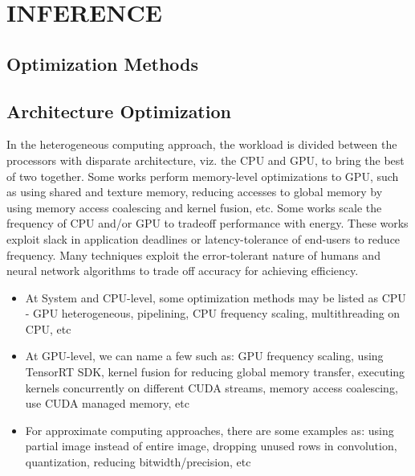 \chapter{INFERENCE}

\renewcommand{\headrulewidth}{0.5pt}
\renewcommand{\footrulewidth}{0.5pt}
\thispagestyle{plain}
\pagestyle{fancy}
\fancyhf{}
\raggedright
{}

\section{Optimization Methods}

    \section{Architecture Optimization}
        In the heterogeneous computing approach, the workload is divided between the processors with disparate architecture, viz. the CPU and GPU, to bring the best of two together. 
        Some works perform memory-level optimizations to GPU, such as using shared and texture memory, reducing accesses to global memory by using memory access coalescing and kernel fusion, etc. 
        Some works scale the frequency of CPU and/or GPU to tradeoff performance with energy. These works exploit slack in application deadlines or latency-tolerance of end-users to reduce frequency. 
        Many techniques exploit the error-tolerant nature of humans and neural network algorithms to trade off accuracy for achieving efficiency.
        \begin{itemize}
            \item At System and CPU-level, some optimization methods may be listed as CPU - GPU heterogeneous, pipelining, CPU frequency scaling, multithreading on CPU, etc
            \item At GPU-level, we can name a few such as: GPU frequency scaling, using TensorRT SDK, kernel fusion for reducing global memory transfer, executing kernels concurrently on different CUDA streams, 
            memory access coalescing, use CUDA managed memory, etc
            \item For approximate computing approaches, there are some examples as: using partial image instead of entire image, dropping unused rows in convolution, quantization, reducing bitwidth/precision, etc
        \end{itemize}

